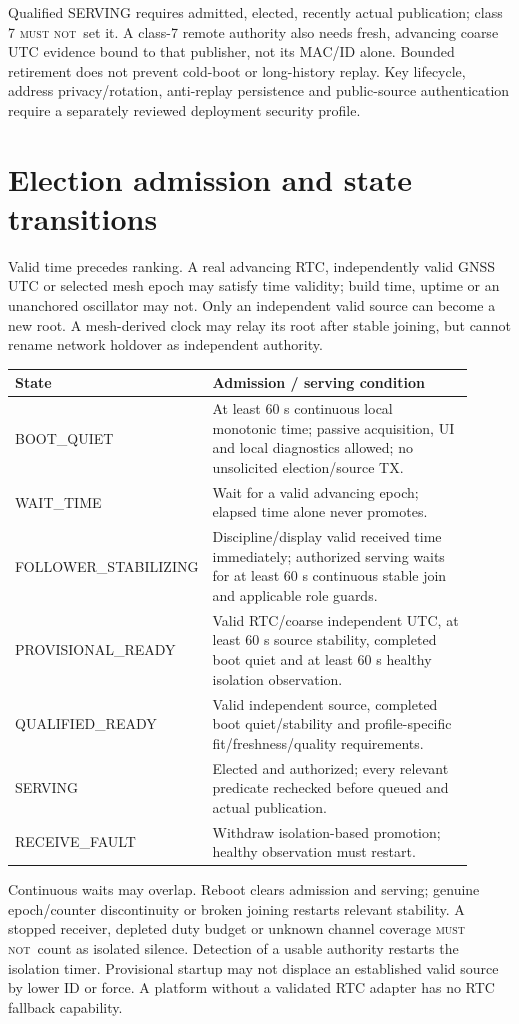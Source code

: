 \documentclass[11pt,letterpaper]{article}
\newcommand{\page}{\clearpage}
\newcommand{\mustnot}{\textsc{must not}}
\begin{document}
Qualified SERVING requires admitted, elected, recently actual publication; class 7 \mustnot\ set it. A class-7 remote authority also needs fresh, advancing coarse UTC evidence bound to that publisher, not its MAC/ID alone. Bounded retirement does not prevent cold-boot or long-history replay. Key lifecycle, address privacy/rotation, anti-replay persistence and public-source authentication require a separately reviewed deployment security profile.

\page
\section{Election admission and state transitions}\label{sec:admission}
Valid time precedes ranking. A real advancing RTC, independently valid GNSS UTC or selected mesh epoch may satisfy time validity; build time, uptime or an unanchored oscillator may not. Only an independent valid source can become a new root. A mesh-derived clock may relay its root after stable joining, but cannot rename network holdover as independent authority.

\begin{center}\small
\begin{tabular}{@{}L{0.25\linewidth}L{0.66\linewidth}@{}}\toprule
State & Admission / serving condition \\\midrule
BOOT\_QUIET & At least 60 s continuous local monotonic time; passive acquisition, UI and local diagnostics allowed; no unsolicited election/source TX. \\
WAIT\_TIME & Wait for a valid advancing epoch; elapsed time alone never promotes. \\
FOLLOWER\_STABILIZING & Discipline/display valid received time immediately; authorized serving waits for at least 60 s continuous stable join and applicable role guards. \\
PROVISIONAL\_READY & Valid RTC/coarse independent UTC, at least 60 s source stability, completed boot quiet and at least 60 s healthy isolation observation. \\
QUALIFIED\_READY & Valid independent source, completed boot quiet/stability and profile-specific fit/freshness/quality requirements. \\
SERVING & Elected and authorized; every relevant predicate rechecked before queued and actual publication. \\
RECEIVE\_FAULT & Withdraw isolation-based promotion; healthy observation must restart. \\\bottomrule
\end{tabular}
\end{center}
Continuous waits may overlap. Reboot clears admission and serving; genuine epoch/counter discontinuity or broken joining restarts relevant stability. A stopped receiver, depleted duty budget or unknown channel coverage \mustnot\ count as isolated silence. Detection of a usable authority restarts the isolation timer. Provisional startup may not displace an established valid source by lower ID or force. A platform without a validated RTC adapter has no RTC fallback capability.
\end{document}
